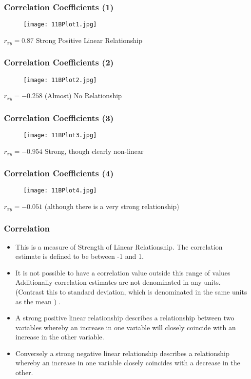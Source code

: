 \documentclass[a4]{beamer}
\begin{document}
\begin{frame}
\frametitle{Correlation Coefficients (1) }
\begin{figure}
  \texttt{[image: 11BPlot1.jpg]}\\

\end{figure}
$r_{xy} = 0.87$ Strong Positive Linear Relationship

\end{frame}
\begin{frame}
\frametitle{Correlation Coefficients (2) }
\begin{figure}
  \texttt{[image: 11BPlot2.jpg]}\\

\end{figure}

$r_{xy} = -0.258$ (Almost) No Relationship
\end{frame}
\begin{frame}
\frametitle{Correlation Coefficients (3) }
\begin{figure}
  \texttt{[image: 11BPlot3.jpg]}\\

\end{figure}

$r_{xy} = -0.954$ Strong, though clearly non-linear
\end{frame}

\begin{frame}
\frametitle{Correlation Coefficients (4) }
\begin{figure}
  \texttt{[image: 11BPlot4.jpg]}\\

\end{figure}
$r_{xy} =  -0.051$ (although there is a very strong
relationship)
\end{frame}

\begin{frame}
\frametitle{Correlation}
\begin{itemize}
\item This is a measure of Strength of Linear Relationship.
The correlation estimate is defined to be between -1 and 1.
\item It is not possible to have a correlation value outside this range of values
Additionally correlation estimates are not denominated in any units. (Contrast this to standard deviation, which is denominated in the same units as the mean ) .
\item A strong positive linear relationship describes a relationship between two variables whereby an increase in one variable will closely coincide with an increase in the other variable.
\item Conversely a strong negative linear relationship describes a relationship whereby an increase in one variable closely coincides with a decrease in the other.
\end{itemize}
\end{frame}
\end{document}
